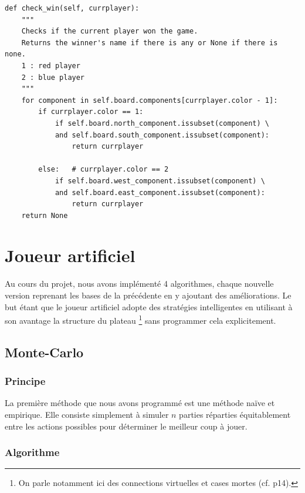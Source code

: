 \documentclass[a4paper]{article}
\theoremstyle{definition}
\begin{document}
\newpage

\begin{lstlisting}
def check_win(self, currplayer):
	"""
	Checks if the current player won the game. 
	Returns the winner's name if there is any or None if there is none.
	1 : red player
	2 : blue player
	"""
	for component in self.board.components[currplayer.color - 1]:
		if currplayer.color == 1:
			if self.board.north_component.issubset(component) \
			and self.board.south_component.issubset(component):
				return currplayer
			
		else: 	# currplayer.color == 2
			if self.board.west_component.issubset(component) \
			and self.board.east_component.issubset(component):
				return currplayer
	return None
\end{lstlisting}

\newpage

\section{Joueur artificiel}

Au cours du projet, nous avons implémenté 4 algorithmes, chaque nouvelle version reprenant les bases de la précédente en y  ajoutant des améliorations. Le but étant que le joueur artificiel adopte des stratégies intelligentes en utilisant à son avantage la structure du plateau \footnote{On parle notamment ici des connections virtuelles et cases mortes (cf. p14).} sans programmer cela explicitement.

\subsection{Monte-Carlo}

\subsubsection{Principe}

La première méthode que nous avons programmé est une méthode naïve et empirique. Elle consiste simplement à simuler $n$ parties réparties équitablement entre les actions possibles pour déterminer le meilleur coup à jouer.

\subsubsection{Algorithme}
\end{document}
